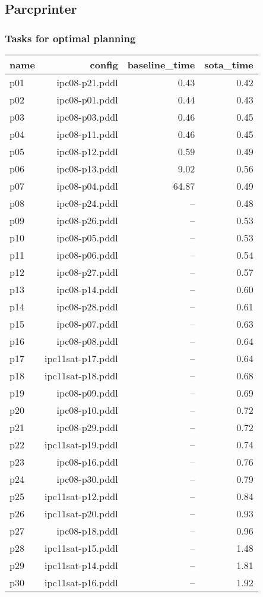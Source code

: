 \documentclass{article}
\begin{document}
                \newpage \subsection{Parcprinter}
                    \subsubsection*{Tasks for optimal planning}
                    
                            \begin{center}
                            \scriptsize
                            \begin{tabular}{@{}l|r|r|r@{}}
                            name & config & baseline\_time & sota\_time\\\midrule
                              p01& ipc08-p21.pddl&0.43&0.42\\
  p02& ipc08-p01.pddl&0.44&0.43\\
  p03& ipc08-p03.pddl&0.46&0.45\\
  p04& ipc08-p11.pddl&0.46&0.45\\
  p05& ipc08-p12.pddl&0.59&0.49\\
  p06& ipc08-p13.pddl&9.02&0.56\\
  p07& ipc08-p04.pddl&64.87&0.49\\
  p08& ipc08-p24.pddl&--&0.48\\
  p09& ipc08-p26.pddl&--&0.53\\
  p10& ipc08-p05.pddl&--&0.53\\
  p11& ipc08-p06.pddl&--&0.54\\
  p12& ipc08-p27.pddl&--&0.57\\
  p13& ipc08-p14.pddl&--&0.60\\
  p14& ipc08-p28.pddl&--&0.61\\
  p15& ipc08-p07.pddl&--&0.63\\
  p16& ipc08-p08.pddl&--&0.64\\
  p17& ipc11sat-p17.pddl&--&0.64\\
  p18& ipc11sat-p18.pddl&--&0.68\\
  p19& ipc08-p09.pddl&--&0.69\\
  p20& ipc08-p10.pddl&--&0.72\\
  p21& ipc08-p29.pddl&--&0.72\\
  p22& ipc11sat-p19.pddl&--&0.74\\
  p23& ipc08-p16.pddl&--&0.76\\
  p24& ipc08-p30.pddl&--&0.79\\
  p25& ipc11sat-p12.pddl&--&0.84\\
  p26& ipc11sat-p20.pddl&--&0.93\\
  p27& ipc08-p18.pddl&--&0.96\\
  p28& ipc11sat-p15.pddl&--&1.48\\
  p29& ipc11sat-p14.pddl&--&1.81\\
  p30& ipc11sat-p16.pddl&--&1.92
                            \end{tabular}
                            \end{center}
                    
\end{document}
